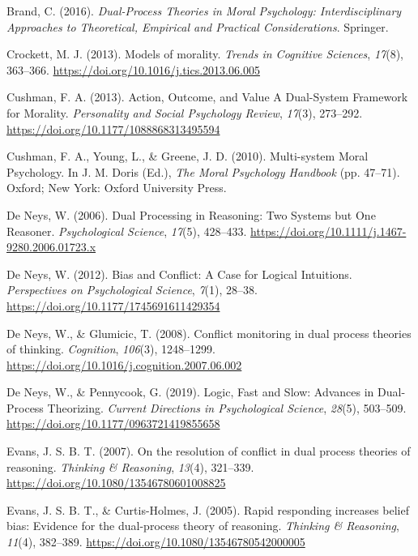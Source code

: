 \documentclass[
  american,
  man,floatsintext]{apa7}
\begin{document}
\leavevmode\hypertarget{ref-brand_dualprocess_2016}{}%
Brand, C. (2016). \emph{Dual-Process Theories in Moral Psychology: Interdisciplinary Approaches to Theoretical, Empirical and Practical Considerations}. Springer.

\leavevmode\hypertarget{ref-crockett_models_2013}{}%
Crockett, M. J. (2013). Models of morality. \emph{Trends in Cognitive Sciences}, \emph{17}(8), 363--366. \url{https://doi.org/10.1016/j.tics.2013.06.005}

\leavevmode\hypertarget{ref-cushman_action_2013}{}%
Cushman, F. A. (2013). Action, Outcome, and Value A Dual-System Framework for Morality. \emph{Personality and Social Psychology Review}, \emph{17}(3), 273--292. \url{https://doi.org/10.1177/1088868313495594}

\leavevmode\hypertarget{ref-cushman_multisystem_2010}{}%
Cushman, F. A., Young, L., \& Greene, J. D. (2010). Multi-system Moral Psychology. In J. M. Doris (Ed.), \emph{The Moral Psychology Handbook} (pp. 47--71). Oxford; New York: Oxford University Press.

\leavevmode\hypertarget{ref-deneys_dual_2006}{}%
De Neys, W. (2006). Dual Processing in Reasoning: Two Systems but One Reasoner. \emph{Psychological Science}, \emph{17}(5), 428--433. \url{https://doi.org/10.1111/j.1467-9280.2006.01723.x}

\leavevmode\hypertarget{ref-deneys_bias_2012}{}%
De Neys, W. (2012). Bias and Conflict: A Case for Logical Intuitions. \emph{Perspectives on Psychological Science}, \emph{7}(1), 28--38. \url{https://doi.org/10.1177/1745691611429354}

\leavevmode\hypertarget{ref-deneys_conflict_2008}{}%
De Neys, W., \& Glumicic, T. (2008). Conflict monitoring in dual process theories of thinking. \emph{Cognition}, \emph{106}(3), 1248--1299. \url{https://doi.org/10.1016/j.cognition.2007.06.002}

\leavevmode\hypertarget{ref-deneys_logic_2019}{}%
De Neys, W., \& Pennycook, G. (2019). Logic, Fast and Slow: Advances in Dual-Process Theorizing. \emph{Current Directions in Psychological Science}, \emph{28}(5), 503--509. \url{https://doi.org/10.1177/0963721419855658}

\leavevmode\hypertarget{ref-evans_resolution_2007}{}%
Evans, J. S. B. T. (2007). On the resolution of conflict in dual process theories of reasoning. \emph{Thinking \& Reasoning}, \emph{13}(4), 321--339. \url{https://doi.org/10.1080/13546780601008825}

\leavevmode\hypertarget{ref-evans_rapid_2005}{}%
Evans, J. S. B. T., \& Curtis-Holmes, J. (2005). Rapid responding increases belief bias: Evidence for the dual-process theory of reasoning. \emph{Thinking \& Reasoning}, \emph{11}(4), 382--389. \url{https://doi.org/10.1080/13546780542000005}
\end{document}
